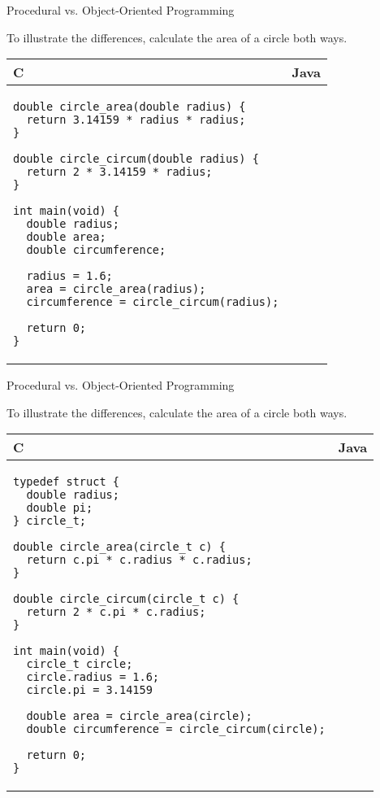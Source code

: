 \documentclass{beamer}
\begin{document}
\begin{frame}[fragile]{Procedural vs. Object-Oriented Programming}

To illustrate the differences, calculate the area of a circle both ways.

\centering
\begin{tabular}{@{}m{} | m{}@{}}
C					&					Java	\\
\hline
\begin{Verbatim}[fontsize=\tiny]
double circle_area(double radius) {
  return 3.14159 * radius * radius;
}

double circle_circum(double radius) {
  return 2 * 3.14159 * radius;
}

int main(void) {
  double radius;
  double area;
  double circumference;

  radius = 1.6;
  area = circle_area(radius);
  circumference = circle_circum(radius);
	
  return 0;
}
\end{Verbatim}	

\end{tabular}

\end{frame}

\begin{frame}[fragile]{Procedural vs. Object-Oriented Programming}

To illustrate the differences, calculate the area of a circle both ways.

\centering
\begin{tabular}{@{}m{} | m{}@{}}
C					&					Java	\\
\hline
\begin{Verbatim}[fontsize=\tiny]
typedef struct {
  double radius;
  double pi;
} circle_t;

double circle_area(circle_t c) {
  return c.pi * c.radius * c.radius;
}

double circle_circum(circle_t c) {
  return 2 * c.pi * c.radius;
}

int main(void) {
  circle_t circle;
  circle.radius = 1.6;
  circle.pi = 3.14159
  
  double area = circle_area(circle);
  double circumference = circle_circum(circle);
	
  return 0;
}
\end{Verbatim}	

\end{tabular}

\end{frame}
\end{document}
